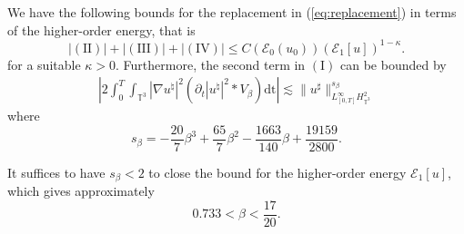 \begin{prop}
  \label{prop:2energy}We have the following bounds for the replacement in
  (\ref{eq:replacement}) in terms of the higher-order energy, that is
  \begin{equation}
    | (\mathrm{I} \mathrm{I}) | + | (\mathrm{I} \mathrm{I} \mathrm{I}) | + | (\mathrm{IV}) | \leqslant C
    (\mathcal{E}_0 (u_0)) (\mathcal{E}_1 [u])^{1 - \kappa} .
    \label{ineq:Ibound}
  \end{equation}
  for a suitable $\kappa > 0$. Furthermore, the second term in $(\mathrm{I})$ can be bounded by
  \begin{align*}
    \left| 2 \int^T_0 \int_{\mathbb{T}^3} | \nabla u^{\natural} |^2
    (\partial_t | u^{\natural} |^2 \ast V_{\beta}) \mathrm{dt} \right| 
    \lesssim  \| u^{\sharp} \|^{s_{\beta}}_{L_{[0, T]}^{\infty}
    H_{\mathbb{T}^3}^2}
  \end{align*}
  where
  \begin{equation}
    s_{\beta} = - \frac{20}{7} \beta^3 + \frac{65}{7} \beta^2 -
    \frac{1663}{140} \beta + \frac{19159}{2800} . \label{eq:def-sbeta}
  \end{equation}
\end{prop}

It suffices to have $s_{\beta} < 2$ to close the bound for the higher-order
energy $\mathcal{E}_1 [u]$, which gives approximately
  \begin{equation}
    0.733 < \beta < \frac{17}{20} .
  \end{equation}

